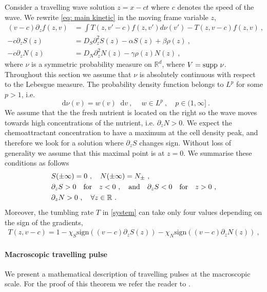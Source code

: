 \documentclass[11pt,twoside]{article}
\theoremstyle{nonumberplain}
\newcommand*\diff{\mathop{}\!\mathrm{d}}
\begin{document}
Consider a travelling wave solution $z=x-ct$ where $c$ denotes the speed of the wave. We rewrite \eqref{eq: main kinetic} in the moving frame variable $z$,
\begin{equation}
\begin{aligned}\label{system}
(v-c)\partial_zf(z,v)&=\int T(z,v'-c)f(z,v')d\nu(v')-T(z,v-c)f(z,v)\ ,\\
-c\partial_z S(z)&=D_S\partial_{z}^2S(z)-\alpha S(z)+\beta \rho(z)\ ,\\
-c\partial_zN(z)&=D_N\partial_{z}^2N(z)-\gamma\rho(z) N(z)
\ ,
\end{aligned}
\end{equation}
where $\nu$ is a symmetric probability measure on $\mathbb{R}^d$, where $V=\textnormal{supp}\ \nu$. Throughout this section we assume that $\nu$ is absolutely continuous with respect to the Lebesgue measure. The probability density function belongs to $L^p$ for some $p > 1$, i.e.
\[
\diff \nu (v)=w(v)\diff v\ ,\ \quad w\in L^p\ , \quad p\in(1,\infty]\ .
\]
We assume that the the fresh nutrient is located on the right so the wave moves towards high concentrations of the nutrient, i.e.  $\partial_zN>0$. We expect the chemoattractant concentration to have a maximum at the cell density peak, and therefore we look for a solution where  $\partial_zS$ changes sign. Without loss of generality we assume that this maximal point is at $z=0$.  We summarise these conditions as follows
\begin{equation}
\begin{aligned}
 &S(\pm \infty)=0\ ,\quad N(\pm\infty)=N_\pm\ ,\\
&\partial_z S>0  \quad  \textrm{for}\quad z<0\ , \quad\textnormal{and}\quad\partial_z S<0 \quad \textrm{for}\quad z>0\ ,\\
&\partial_zN>0\ ,\quad\forall z\in\mathbb{R}\ .\label{eq: cond chemicals}
\end{aligned}
\end{equation}
Moreover, the tumbling rate $T$ in \eqref{system} can take only four values depending on the sign of the gradients,
\begin{eqnarray}\label{tumbl}
   T(z,v-c)=1-\chi_S \textrm{sign}((v-c)\partial_z S(z))-\chi_N \textrm{sign}((v-c)\partial_z N(z))\ ,
\end{eqnarray}

\paragraph{Macroscopic travelling pulse}
We present a mathematical description of travelling pulses at the macroscopic scale. For the proof of this theorem we refer the reader to \cite{calvez2016chemotactic}.
\end{document}

